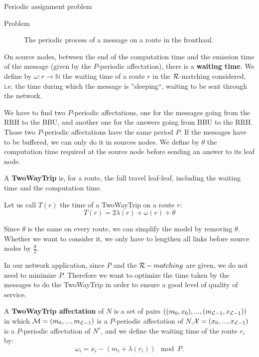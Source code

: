 \documentclass[a4paper,10pt]{report}
\begin{document}
\begin{chapter}{Periodic assignment problem}
\begin{section}{Problem}
\begin{center}
{{\begin{figure}[H]
\begin{center}
{
}
\end{center}
\caption{The periodic process of a message on a route in the fronthaul.}
\end{figure}

}}\end{center}


On source nodes, between the end of the computation time and the emission time of the message (given by the $P$-periodic affectation), there is a {\bf waiting time}. 
We define by $\omega: r \rightarrow \mathbb{N}$ the waiting time of a route $r$ in the ${\cal R}$-matching considered, i.e. the time during which the
message is ''sleeping``, waiting to be sent through the network.


We have to find two $P$-periodic affectations, one for the messages going from the RRH to the BBU, and another one for the answers going from BBU to the RRH. Those two $P$-periodic affectations have the same period $P$. 
If the messages have to be buffered, we can only do it in sources nodes.
We define by $\theta$ the computation time required at the source node before sending an answer to its leaf node.

A {\bf TwoWayTrip} is, for a route, the full travel leaf-leaf, including the waiting time and the computation time.

Let us call $T (r)$ the time of a TwoWayTrip on a route $r$: $$ T (r) = 2\lambda (r) + \omega (r) + \theta$$

Since $\theta$ is the same on every route, we can simplify the model by removing $\theta$. Whether we want to consider it, we only have to lengthen all 
links before source nodes by $\frac{\theta}{2}$. 


In our network application, since $P$ and the ${\cal R}-matching$ are given, we do not need to minimize $P$.
Therefore we want to optimize the time taken by the messages to do the TwoWayTrip in order to ensure a good level of quality of service.

A {\bf TwoWayTrip affectation} of $N$ is a set of pairs $ ((m_0,x_0),...,(m_{{\cal L}-1},x_{{\cal L}-1}))$ in which ${\cal M} = (m_0,...,m_{{\cal L}-1})$ 
is a $P$-periodic affectation of $N$,${\cal X} = (x_0,...,x_{{\cal L}-1})$ is a $P$-periodic affectation of $N^r$, and we define the waiting time of the route $r_i$ by:
$$ \omega_i = x_i - (m_i + \lambda(r_i)) \mod P .$$ 


\end{section}
\end{chapter}
\end{document}
